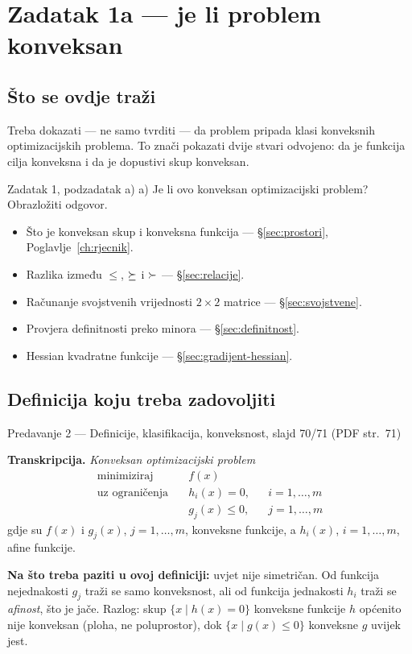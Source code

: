 \chapter{Zadatak 1a --- je li problem konveksan}
\label{ch:z1-konveksnost}

\section{Što se ovdje traži}

Treba dokazati --- ne samo tvrditi --- da problem pripada klasi konveksnih
optimizacijskih problema. To znači pokazati dvije stvari odvojeno: da je funkcija
cilja konveksna i da je dopustivi skup konveksan.

\begin{zadatak}{Zadatak 1, podzadatak a)}
a) Je li ovo konveksan optimizacijski problem? Obrazložiti odgovor.
\end{zadatak}

\begin{predznanje}
\begin{itemize}[nosep,leftmargin=*]
  \item Što je konveksan skup i konveksna funkcija --- \S\ref{sec:prostori}, Poglavlje~\ref{ch:rjecnik}.
  \item Razlika između $\leq$, $\succeq$ i $\succ$ --- \S\ref{sec:relacije}.
  \item Računanje svojstvenih vrijednosti $2\times2$ matrice --- \S\ref{sec:svojstvene}.
  \item Provjera definitnosti preko minora --- \S\ref{sec:definitnost}.
  \item Hessian kvadratne funkcije --- \S\ref{sec:gradijent-hessian}.
\end{itemize}
\end{predznanje}

\section{Definicija koju treba zadovoljiti}
\label{sec:z1a-definicija}

\begin{izvor}{Predavanje 2 --- Definicije, klasifikacija, konveksnost, slajd 70/71 (PDF str.~71)}

\textbf{Transkripcija.} \emph{Konveksan optimizacijski problem}
\[
\begin{aligned}
\text{minimiziraj} \quad & f(x) \\
\text{uz ograničenja} \quad & h_i(x) = 0, && i = 1, \dots, m \\
& g_j(x) \leq 0, && j = 1, \dots, m
\end{aligned}
\]
gdje su $f(x)$ i $g_j(x)$, $j = 1, \dots, m$, konveksne funkcije, a $h_i(x)$,
$i = 1, \dots, m$, afine funkcije.

\textbf{Na što treba paziti u ovoj definiciji:} uvjet nije simetričan. Od
funkcija nejednakosti $g_j$ traži se samo konveksnost, ali od funkcija jednakosti
$h_i$ traži se \emph{afinost}, što je jače. Razlog: skup $\{x \mid h(x) = 0\}$
konveksne funkcije $h$ općenito nije konveksan (ploha, ne poluprostor), dok
$\{x \mid g(x) \leq 0\}$ konveksne $g$ uvijek jest.
\end{izvor}

